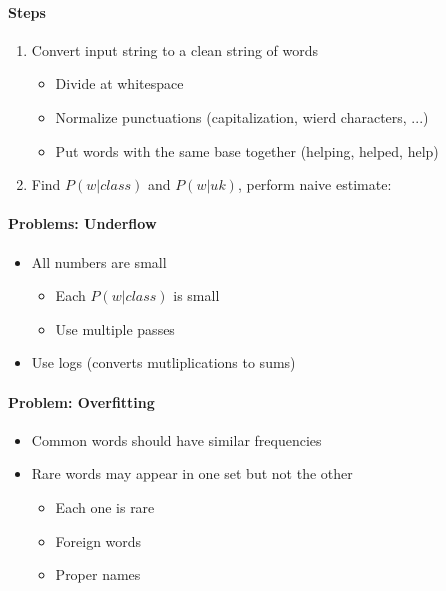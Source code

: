      \paragraph{Steps}
      \begin{enumerate}
        \item Convert input string to a clean string of words
        \begin{itemize}
          \item Divide at whitespace
          \item Normalize punctuations (capitalization, wierd characters, ...)
          \item Put words with the same base together (helping, helped, help)
        \end{itemize}

        \item Find $ P(w | class) $ and $ P (w | uk) $, perform naive estimate:
      \end{enumerate}

      \paragraph{Problems: Underflow}
      \begin{itemize}
        \item All numbers are small
        \begin{itemize}
          \item Each $ P ( w| class) $ is small
          \item Use multiple passes
        \end{itemize}

        \item Use logs (converts mutliplications to sums)
      \end{itemize}

      \paragraph{Problem: Overfitting}
      \begin{itemize}
        \item Common words should have similar frequencies
        \item Rare words may appear in one set but not the other
        \begin{itemize}
          \item Each one is rare
          \item Foreign words
          \item Proper names
        \end{itemize}
      \end{itemize}

